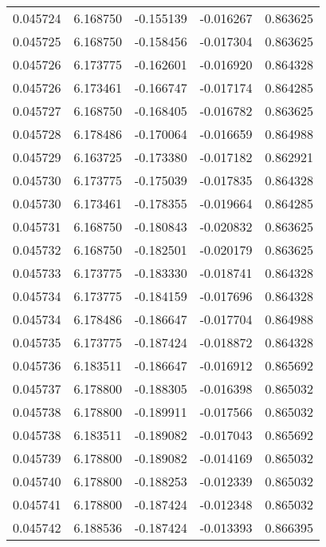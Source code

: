 \begin{tabular}{lrrrr}
0.045724    &  6.168750 & -0.155139 & -0.016267 &             0.863625 \\
0.045725    &  6.168750 & -0.158456 & -0.017304 &             0.863625 \\
0.045726    &  6.173775 & -0.162601 & -0.016920 &             0.864328 \\
0.045726    &  6.173461 & -0.166747 & -0.017174 &             0.864285 \\
0.045727    &  6.168750 & -0.168405 & -0.016782 &             0.863625 \\
0.045728    &  6.178486 & -0.170064 & -0.016659 &             0.864988 \\
0.045729    &  6.163725 & -0.173380 & -0.017182 &             0.862921 \\
0.045730    &  6.173775 & -0.175039 & -0.017835 &             0.864328 \\
0.045730    &  6.173461 & -0.178355 & -0.019664 &             0.864285 \\
0.045731    &  6.168750 & -0.180843 & -0.020832 &             0.863625 \\
0.045732    &  6.168750 & -0.182501 & -0.020179 &             0.863625 \\
0.045733    &  6.173775 & -0.183330 & -0.018741 &             0.864328 \\
0.045734    &  6.173775 & -0.184159 & -0.017696 &             0.864328 \\
0.045734    &  6.178486 & -0.186647 & -0.017704 &             0.864988 \\
0.045735    &  6.173775 & -0.187424 & -0.018872 &             0.864328 \\
0.045736    &  6.183511 & -0.186647 & -0.016912 &             0.865692 \\
0.045737    &  6.178800 & -0.188305 & -0.016398 &             0.865032 \\
0.045738    &  6.178800 & -0.189911 & -0.017566 &             0.865032 \\
0.045738    &  6.183511 & -0.189082 & -0.017043 &             0.865692 \\
0.045739    &  6.178800 & -0.189082 & -0.014169 &             0.865032 \\
0.045740    &  6.178800 & -0.188253 & -0.012339 &             0.865032 \\
0.045741    &  6.178800 & -0.187424 & -0.012348 &             0.865032 \\
0.045742    &  6.188536 & -0.187424 & -0.013393 &             0.866395 \\

\end{tabular}
